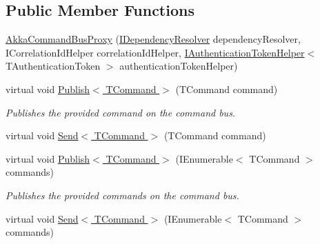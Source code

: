\subsection*{Public Member Functions}
\begin{DoxyCompactItemize}
\item 
\hyperlink{classCqrs_1_1Akka_1_1Commands_1_1AkkaCommandBusProxy_ad9a3fa7aa546bc2c398d4f52d0659656}{Akka\+Command\+Bus\+Proxy} (\hyperlink{interfaceCqrs_1_1Configuration_1_1IDependencyResolver}{I\+Dependency\+Resolver} dependency\+Resolver, I\+Correlation\+Id\+Helper correlation\+Id\+Helper, \hyperlink{interfaceCqrs_1_1Authentication_1_1IAuthenticationTokenHelper}{I\+Authentication\+Token\+Helper}$<$ T\+Authentication\+Token $>$ authentication\+Token\+Helper)
\item 
virtual void \hyperlink{classCqrs_1_1Akka_1_1Commands_1_1AkkaCommandBusProxy_a410c0fe52016d04de950b1ae767d2ccb}{Publish$<$ T\+Command $>$} (T\+Command command)
\begin{DoxyCompactList}\small\item\em Publishes the provided {\itshape command}  on the command bus. \end{DoxyCompactList}\item 
virtual void \hyperlink{classCqrs_1_1Akka_1_1Commands_1_1AkkaCommandBusProxy_a15945f41b7439e722f5608f48b63c6d9}{Send$<$ T\+Command $>$} (T\+Command command)
\item 
virtual void \hyperlink{classCqrs_1_1Akka_1_1Commands_1_1AkkaCommandBusProxy_a81dc8162ca933d84b6aee04aff589010}{Publish$<$ T\+Command $>$} (I\+Enumerable$<$ T\+Command $>$ commands)
\begin{DoxyCompactList}\small\item\em Publishes the provided {\itshape commands}  on the command bus. \end{DoxyCompactList}\item 
virtual void \hyperlink{classCqrs_1_1Akka_1_1Commands_1_1AkkaCommandBusProxy_a30115e2f8c964967aa8fe94712ece7c2}{Send$<$ T\+Command $>$} (I\+Enumerable$<$ T\+Command $>$ commands)
\end{DoxyCompactItemize}
